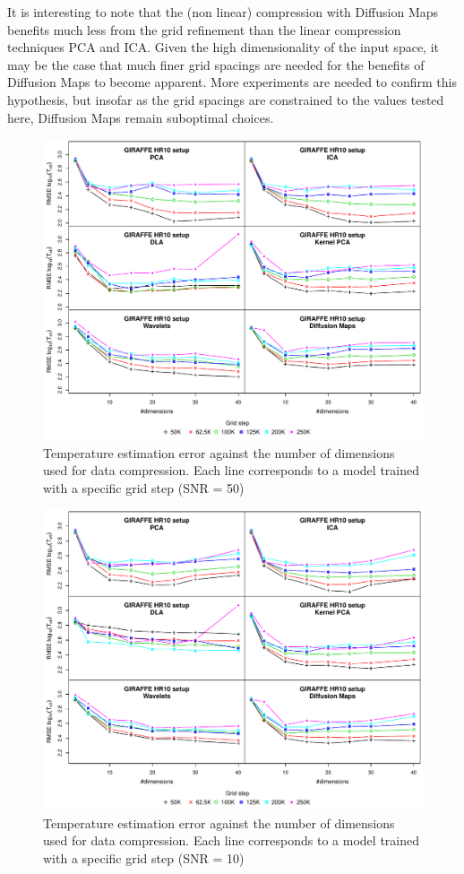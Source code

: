 \documentclass[a4paper,fleqn,usenatbib]{mnras}
\begin{document}
{It is interesting to note that the (non linear) compression with 
Diffusion Maps benefits much less from the grid refinement than the 
linear compression techniques PCA and ICA. Given the high dimensionality 
of the input space, it may be the case that much finer grid spacings 
are needed for the benefits of Diffusion Maps to become apparent. More 
experiments are needed to confirm this hypothesis, but insofar as the 
grid spacings are constrained to the values tested here, Diffusion Maps 
remain suboptimal choices.

\begin{figure}
\centering\includegraphics[width=\textwidth]{bestSVM_Teff_N-RMSE_HR10_snr=50_all.pdf}
\caption{Temperature estimation error against the number of dimensions
  used for data compression. Each line corresponds to a model trained
  with a specific grid step (SNR = 50)}
\label{fig:grid50}
\end{figure}

\begin{figure}
\centering\includegraphics[width=\textwidth]{bestSVM_Teff_N-RMSE_HR10_snr=10_all.pdf}
\caption{Temperature estimation error against the number of dimensions
  used for data compression. Each line corresponds to a model trained
  with a specific grid step (SNR = 10)}
\label{fig:grid10}
\end{figure}

}
\end{document}
